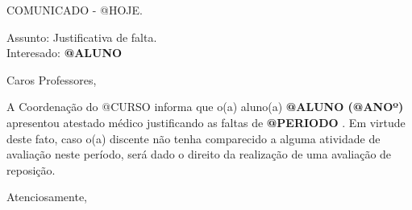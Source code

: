 


\hspace{.2cm}


\noindent COMUNICADO - @HOJE.

\noindent Assunto: Justificativa de falta.\\
Interesado: {\bf @ALUNO }

\noindent Caros Professores,

\onehalfspacing A Coordenação do @CURSO informa que o(a) aluno(a) {\bf @ALUNO (@ANOº) } apresentou atestado médico justificando as faltas de {\bf @PERIODO }. Em virtude deste fato, caso o(a) discente não tenha comparecido a alguma atividade de avaliação neste período, será dado o direito da realização de uma avaliação de reposição.

\noindent Atenciosamente,





